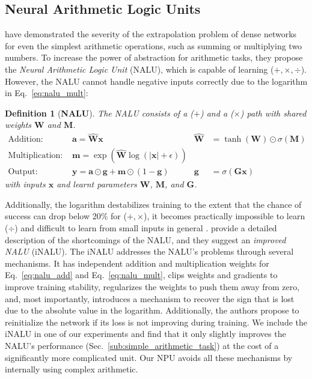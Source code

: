 \documentclass[9pt]{article}
\newtheorem*{definition}{Definition}
\begin{document}
\subsection{Neural Arithmetic Logic Units}%
\label{sub:neural_arithmetic_logic_unit}

\citet{trask_neural_2018} have demonstrated the severity of the extrapolation
problem of dense networks for even the simplest arithmetic operations, such as
summing or multiplying two numbers.  To increase the power of
abstraction for arithmetic tasks, they propose the \emph{Neural Arithmetic
Logic Unit} (NALU), which is capable of learning ($+,\times,\div$).  However,
the NALU cannot handle negative inputs correctly due to the logarithm in
Eq.~\ref{eq:nalu_mult}:

\begin{definition}[{\bf NALU}]
  The NALU consists of a ($+$) and a ($\times$) path with shared weights $\bm W$ and $\bm M$.
  \begin{align}
    \label{eq:nalu_add}
    \text{Addition: }       & \bm a = \bm{\hat W} \bm x
                            & \bm{\hat W}& = \tanh(\bm{W}) \odot \sigma(\bm{M}) \\
    \label{eq:nalu_mult}
    \text{Multiplication: } & \bm m = \exp (\bm{\hat W}\log(|\bm x|+\epsilon)) & &\\
    \text{Output: }         & \bm y = \bm a \odot \bm g + \bm m \odot (1-\bm g) 
                            & \bm g& = \sigma(\bm G\bm x)
  \end{align}
  with inputs $\bm x$ and learnt parameters $\bm W$, $\bm M$, and $\bm G$.
\end{definition}

Additionally, the logarithm destabilizes training to the extent that the chance of success
can drop below 20\% for ($+,\times$), it becomes practically impossible to
learn ($\div$) and difficult to learn from small inputs in general
\citep{madsen_measuring_2019}.
\cite{schlor_inalu_2020} provide a detailed description of the shortcomings of
the NALU, and they suggest an \emph{improved NALU} (iNALU).  The iNALU addresses
the NALU's problems through several mechanisms.  It has independent
addition and multiplication weights for Eq.~\ref{eq:nalu_add} and
Eq.~\ref{eq:nalu_mult}, clips weights and gradients to improve training
stability, regularizes the weights to push them away from zero, and, most
importantly, introduces a mechanism to recover the sign that is lost due to the
absolute value in the logarithm. Additionally, the authors propose to
reinitialize the network if its loss is not improving during training.  We
include the iNALU in one of our experiments and find that it only slightly
improves the NALU's performance (Sec.~\ref{sub:simple_arithmetic_task}) at the
cost of a significantly more complicated unit. Our NPU avoids all these mechanisms
by internally using complex arithmetic.
\end{document}
